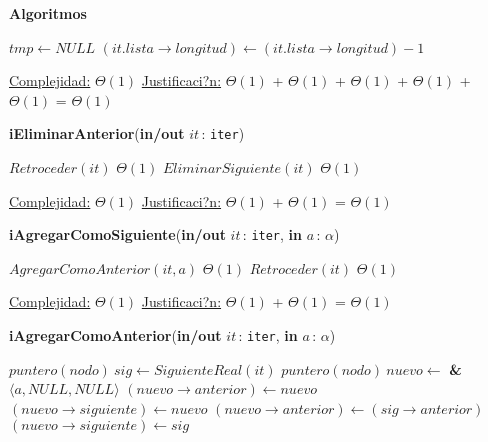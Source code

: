 \documentclass[a4paper,10pt]{article}
\let\TipoVariable=\texttt
\let\ModificadorArgumento=\textbf
\newcommand{\In}[2]{\ModificadorArgumento{in} \ensuremath{#1}\,: \TipoVariable{#2}\xspace}
\newcommand{\Inout}[2]{\ModificadorArgumento{in/out} \ensuremath{#1}\,: \TipoVariable{#2}\xspace}
\newenvironment{Algoritmos}{%
  \vspace*{2ex}%
  \noindent\textbf{\Large Algoritmos}%
  \vspace*{2ex}%
}{}
\begin{document}
\begin{Algoritmos}
\begin{algorithm}[H]
\begin{algorithmic}[1]
			\State $tmp \gets NULL$	 
			\State $(it.lista\rightarrow longitud) \gets (it.lista\rightarrow longitud) - 1$

			\medskip
			\Statex \underline{Complejidad:} $\Theta(1)$
			\Statex \underline{Justificaci?n:} $\Theta(1)$ + $\Theta(1)$ + $\Theta(1)$ + $\Theta(1)$ + $\Theta(1)$ =  $\Theta(1)$
    	\end{algorithmic}
\end{algorithm}

	
\begin{algorithm}[H]
	\begin{algorithmic}[1]
		\State \textbf{iEliminarAnterior}(\Inout{it}{iter})
		
			\State $Retroceder(it)$	\Comment $\Theta(1)$
			\State $EliminarSiguiente(it)$	\Comment $\Theta(1)$

			\medskip
			\Statex \underline{Complejidad:} $\Theta(1)$
			\Statex \underline{Justificaci?n:} $\Theta(1)$ + $\Theta(1)$ = $\Theta(1)$
    	\end{algorithmic}
\end{algorithm}


\begin{algorithm}[H]
	\begin{algorithmic}[1]
		\State \textbf{iAgregarComoSiguiente}(\Inout{it}{iter}, \In{a}{$\alpha$})
		
			\State $AgregarComoAnterior(it, a)$		\Comment $\Theta(1)$
			\State $Retroceder(it)$	\Comment $\Theta(1)$

			\medskip
			\Statex \underline{Complejidad:} $\Theta(1)$
			\Statex \underline{Justificaci?n:} $\Theta(1)$ + $\Theta(1)$ = $\Theta(1)$
    	\end{algorithmic}
\end{algorithm}
	

\begin{algorithm}[H]
	\begin{algorithmic}[1]
		\State \textbf{iAgregarComoAnterior}(\Inout{it}{iter}, \In{a}{$\alpha$})
		
			\State $puntero(nodo) \ sig \gets SiguienteReal(it)$
			\State $puntero(nodo) \ nuevo \gets $ \textbf{\&} $\langle a, NULL, NULL \rangle$ 
				\State $(nuevo\rightarrow anterior) \gets nuevo$
				\State $(nuevo\rightarrow siguiente) \gets nuevo$
			\Else
				\State $(nuevo\rightarrow anterior) \gets (sig\rightarrow anterior)$
				\State $(nuevo\rightarrow siguiente) \gets sig$
			\EndIf
			

\end{algorithmic}
\end{algorithm}
\end{Algoritmos}
\end{document}
